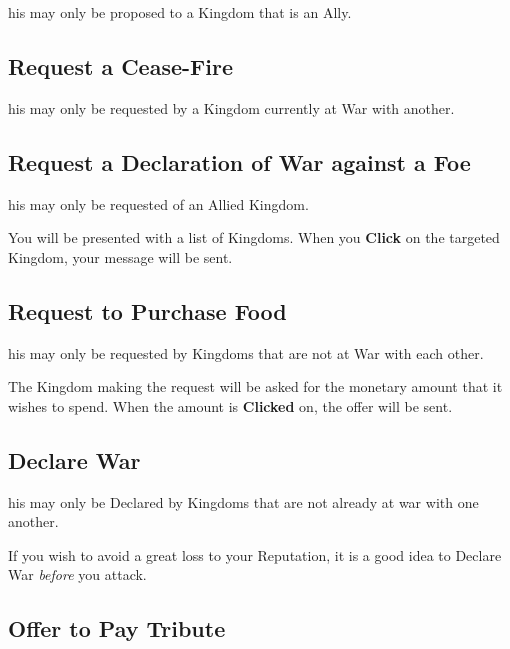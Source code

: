 
his may only be proposed to a Kingdom that is an Ally.

\subsection{Request a Cease-Fire}


his may only be requested by a Kingdom currently at War with another.

\subsection{Request a Declaration of War against a Foe}


his may only be requested of an Allied Kingdom.

You will be presented with a list of Kingdoms. When you \textbf{Click} on the targeted Kingdom, your message will be sent.

\subsection{Request to Purchase Food}


his may only be requested by Kingdoms that are not at War with each other.

The Kingdom making the request will be asked for the monetary amount that it wishes to spend. When the amount is \textbf{Clicked} on, the offer will be sent.

\subsection{Declare War}


his may only be Declared by Kingdoms that are not already at war with one another.

If you wish to avoid a great loss to your Reputation, it is a good idea to Declare War \textit{before} you attack.

\subsection{Offer to Pay Tribute}


